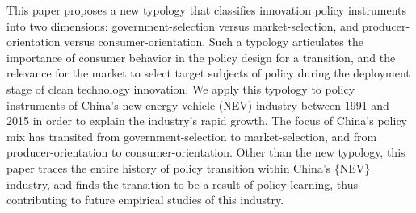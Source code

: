 This paper proposes a new typology that classifies innovation policy instruments into two dimensions: government-selection versus market-selection, and producer-orientation versus consumer-orientation. Such a typology articulates the importance of consumer behavior in the policy design for a transition, and the relevance for the market to select target subjects of policy during the deployment stage of clean technology innovation. We apply this typology to policy instruments of China's new energy vehicle (NEV) industry between 1991 and 2015 in order to explain the industry's rapid growth. The focus of China's policy mix has transited from government-selection to market-selection, and from producer-orientation to consumer-orientation. Other than the new typology, this paper traces the entire history of policy transition within China's \{NEV\} industry, and finds the transition to be a result of policy learning, thus contributing to future empirical studies of this industry.